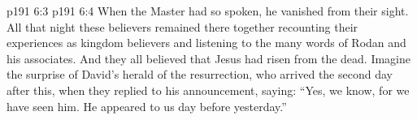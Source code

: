 \vs p191 6:3 
\vs p191 6:4 When the Master had so spoken, he vanished from their sight. All that night these believers remained there together recounting their experiences as kingdom believers and listening to the many words of Rodan and his associates. And they all believed that Jesus had risen from the dead. Imagine the surprise of David’s herald of the resurrection, who arrived the second day after this, when they replied to his announcement, saying: “Yes, we know, for we have seen him. He appeared to us day before yesterday.”
\quizlink
